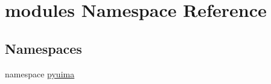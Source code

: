 \hypertarget{namespacemodules}{\section{modules \-Namespace \-Reference}
\label{namespacemodules}
}
\subsection*{\-Namespaces}
\begin{DoxyCompactItemize}
\item 
namespace \hyperlink{namespacemodules_1_1pyuima}{pyuima}
\end{DoxyCompactItemize}
